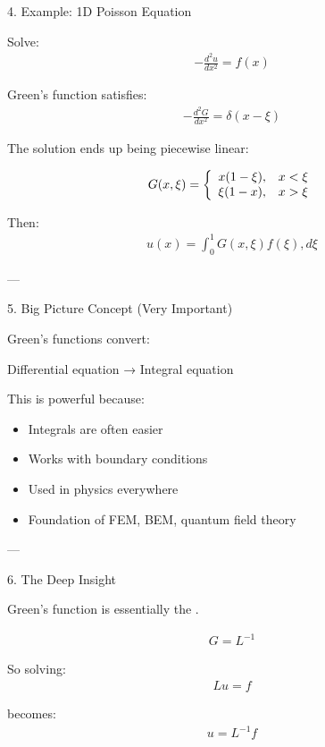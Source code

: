 \documentclass[12pt,a4paper]{report}
\begin{document}
{\begin{description}
\item 4. Example: 1D Poisson Equation

Solve:
\begin{align*}
-\frac{d^2 u}{dx^2} = f(x)
\end{align*}

Green’s function satisfies:
\begin{align*}
-\frac{d^2 G}{dx^2} = \delta(x-\xi)
\end{align*}

The solution ends up being piecewise linear:

\begin{align*}
G(x,\xi) = \left \{ \begin{array}{ll}  x(1-\xi), & x < \xi \\  \xi(1-x), & x > \xi \end{array} \right .
\end{align*}

Then:
\begin{align*}
u(x) = \int_0^1 G(x,\xi) f(\xi), d\xi
\end{align*}

---

\item 5. Big Picture Concept (Very Important)

Green’s functions convert:

\item Differential equation → Integral equation

This is powerful because:

\begin{itemize}
\item Integrals are often easier
\item Works with boundary conditions
\item Used in physics everywhere
\item Foundation of FEM, BEM, quantum field theory
\end{itemize}

---

\item 6. The Deep Insight

Green’s function is essentially the .

\begin{align*}
G = L^{-1}
\end{align*}

So solving:
\begin{align*}
Lu = f
\end{align*}

becomes:
\begin{align*}
u = L^{-1} f
\end{align*}


\end{description}}
\end{document}

